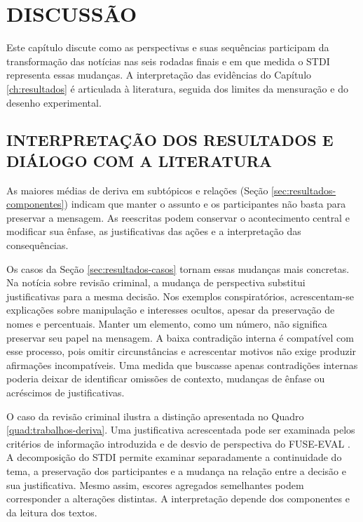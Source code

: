 \chapter{DISCUSSÃO}
\label{ch:discussao}

Este capítulo discute como as perspectivas e suas sequências participam da transformação das notícias nas seis rodadas finais e em que medida o STDI representa essas mudanças. A interpretação das evidências do Capítulo \ref{ch:resultados} é articulada à literatura, seguida dos limites da mensuração e do desenho experimental.

\section{INTERPRETAÇÃO DOS RESULTADOS E DIÁLOGO COM A LITERATURA}
\label{sec:discussao-interpretacao}

As maiores médias de deriva em subtópicos e relações (Seção \ref{sec:resultados-componentes}) indicam que manter o assunto e os participantes não basta para preservar a mensagem. As reescritas podem conservar o acontecimento central e modificar sua ênfase, as justificativas das ações e a interpretação das consequências.

Os casos da Seção \ref{sec:resultados-casos} tornam essas mudanças mais concretas. Na notícia sobre revisão criminal, a mudança de perspectiva substitui justificativas para a mesma decisão. Nos exemplos conspiratórios, acrescentam-se explicações sobre manipulação e interesses ocultos, apesar da preservação de nomes e percentuais. Manter um elemento, como um número, não significa preservar seu papel na mensagem. A baixa contradição interna é compatível com esse processo, pois omitir circunstâncias e acrescentar motivos não exige produzir afirmações incompatíveis. Uma medida que buscasse apenas contradições internas poderia deixar de identificar omissões de contexto, mudanças de ênfase ou acréscimos de justificativas.

O caso da revisão criminal ilustra a distinção apresentada no Quadro \ref{quad:trabalhos-deriva}. Uma justificativa acrescentada pode ser examinada pelos critérios de informação introduzida e de desvio de perspectiva do FUSE-EVAL \cite{liu2025stepwise}. A decomposição do STDI permite examinar separadamente a continuidade do tema, a preservação dos participantes e a mudança na relação entre a decisão e sua justificativa. Mesmo assim, escores agregados semelhantes podem corresponder a alterações distintas. A interpretação depende dos componentes e da leitura dos textos.

